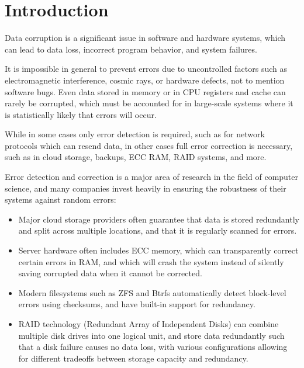\chapter{Introduction}

Data corruption is a significant issue in software and hardware systems, which can lead to data loss, incorrect program behavior, and system failures.

It is impossible in general to prevent errors due to uncontrolled factors such as electromagnetic interference, cosmic rays, or hardware defects, not to mention software bugs.
Even data stored in memory or in CPU registers and cache can rarely be corrupted, which must be accounted for in large-scale systems where it is statistically likely that errors will occur.
\cite{radiation-errors, dram-errors-in-the-wild}

While in some cases only error detection is required, such as for network protocols which can resend data, in other cases full error correction is necessary, such as in cloud storage, backups, ECC RAM, RAID systems, and more.

Error detection and correction is a major area of research in the field of computer science, and many companies invest heavily in ensuring the robustness of their systems against random errors:

\begin{itemize}
    \item Major cloud storage providers often guarantee that data is stored redundantly and split across multiple locations, and that it is regularly scanned for errors. \cite{azure, backblaze, google-cloud}
    \item Server hardware often includes ECC memory, which can transparently correct certain errors in RAM, and which will crash the system instead of silently saving corrupted data when it cannot be corrected. \cite{ecc-market, azure-ecc}
    \item Modern filesystems such as ZFS and Btrfs automatically detect block-level errors using checksums, and have built-in support for redundancy. \cite{zfs-vs-btrfs}
    \item RAID technology (Redundant Array of Independent Disks) can combine multiple disk drives into one logical unit, and store data redundantly such that a disk failure causes no data loss,
          with various configurations allowing for different tradeoffs between storage capacity and redundancy. \cite{raid-case}
\end{itemize}

